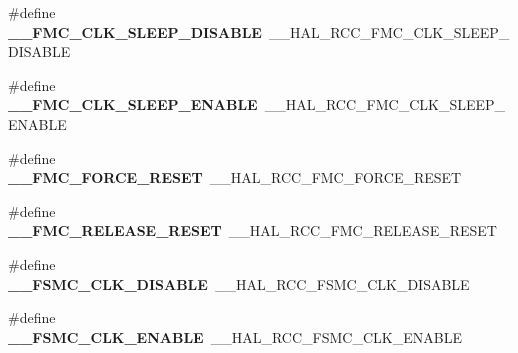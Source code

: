 \begin{DoxyCompactItemize}
\item 
\hypertarget{group___h_a_l___r_c_c___aliased_ga9e6ab3878854d53e5d689782e0da6c12}{\#define {\bfseries \-\_\-\-\_\-\-F\-M\-C\-\_\-\-C\-L\-K\-\_\-\-S\-L\-E\-E\-P\-\_\-\-D\-I\-S\-A\-B\-L\-E}~\-\_\-\-\_\-\-H\-A\-L\-\_\-\-R\-C\-C\-\_\-\-F\-M\-C\-\_\-\-C\-L\-K\-\_\-\-S\-L\-E\-E\-P\-\_\-\-D\-I\-S\-A\-B\-L\-E}\label{group___h_a_l___r_c_c___aliased_ga9e6ab3878854d53e5d689782e0da6c12}

\item 
\hypertarget{group___h_a_l___r_c_c___aliased_ga1a8e1503902302cc5db2c8991e94d1d5}{\#define {\bfseries \-\_\-\-\_\-\-F\-M\-C\-\_\-\-C\-L\-K\-\_\-\-S\-L\-E\-E\-P\-\_\-\-E\-N\-A\-B\-L\-E}~\-\_\-\-\_\-\-H\-A\-L\-\_\-\-R\-C\-C\-\_\-\-F\-M\-C\-\_\-\-C\-L\-K\-\_\-\-S\-L\-E\-E\-P\-\_\-\-E\-N\-A\-B\-L\-E}\label{group___h_a_l___r_c_c___aliased_ga1a8e1503902302cc5db2c8991e94d1d5}

\item 
\hypertarget{group___h_a_l___r_c_c___aliased_gacd251c599d336a530f707c25f999a639}{\#define {\bfseries \-\_\-\-\_\-\-F\-M\-C\-\_\-\-F\-O\-R\-C\-E\-\_\-\-R\-E\-S\-E\-T}~\-\_\-\-\_\-\-H\-A\-L\-\_\-\-R\-C\-C\-\_\-\-F\-M\-C\-\_\-\-F\-O\-R\-C\-E\-\_\-\-R\-E\-S\-E\-T}\label{group___h_a_l___r_c_c___aliased_gacd251c599d336a530f707c25f999a639}

\item 
\hypertarget{group___h_a_l___r_c_c___aliased_gaafeb1568456dc0cfe7b305b98f4ee9a2}{\#define {\bfseries \-\_\-\-\_\-\-F\-M\-C\-\_\-\-R\-E\-L\-E\-A\-S\-E\-\_\-\-R\-E\-S\-E\-T}~\-\_\-\-\_\-\-H\-A\-L\-\_\-\-R\-C\-C\-\_\-\-F\-M\-C\-\_\-\-R\-E\-L\-E\-A\-S\-E\-\_\-\-R\-E\-S\-E\-T}\label{group___h_a_l___r_c_c___aliased_gaafeb1568456dc0cfe7b305b98f4ee9a2}

\item 
\hypertarget{group___h_a_l___r_c_c___aliased_ga2e6fc3790a97821d4677d08212326dd0}{\#define {\bfseries \-\_\-\-\_\-\-F\-S\-M\-C\-\_\-\-C\-L\-K\-\_\-\-D\-I\-S\-A\-B\-L\-E}~\-\_\-\-\_\-\-H\-A\-L\-\_\-\-R\-C\-C\-\_\-\-F\-S\-M\-C\-\_\-\-C\-L\-K\-\_\-\-D\-I\-S\-A\-B\-L\-E}\label{group___h_a_l___r_c_c___aliased_ga2e6fc3790a97821d4677d08212326dd0}

\item 
\hypertarget{group___h_a_l___r_c_c___aliased_ga20b6806843b156dfa5cc96194b7477d3}{\#define {\bfseries \-\_\-\-\_\-\-F\-S\-M\-C\-\_\-\-C\-L\-K\-\_\-\-E\-N\-A\-B\-L\-E}~\-\_\-\-\_\-\-H\-A\-L\-\_\-\-R\-C\-C\-\_\-\-F\-S\-M\-C\-\_\-\-C\-L\-K\-\_\-\-E\-N\-A\-B\-L\-E}\label{group___h_a_l___r_c_c___aliased_ga20b6806843b156dfa5cc96194b7477d3}


\end{DoxyCompactItemize}
